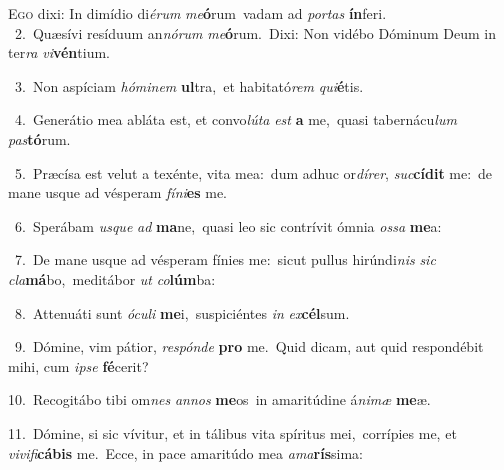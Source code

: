 \lettrine{\initial\textcolor{\initialcolor}{E}}{go} dixi: In dimídio di\-\textit{é}\-\textit{rum} \textit{me}\-\textbf{ó}rum~\star vadam ad \textit{por}\-\textit{tas} \textbf{ín}\-feri.\\
{\numbfont\textcolor{\numbcolor}{~2.}}~Quæsívi resíduum an\-\textit{nó}\-\textit{rum} \textit{me}\-\textbf{ó}rum.~\star Dixi: Non vidébo Dóminum Deum in ter\textit{ra} \textit{vi}\-\textbf{vén}tium.\par
{\numbfont\textcolor{\numbcolor}{~3.}}~Non aspíciam \textit{hó}\-\textit{mi}\textit{nem} \textbf{ul}\-tra,~\star et habitató\textit{rem} \textit{qui}\-\textbf{é}tis.\par
{\numbfont\textcolor{\numbcolor}{~4.}}~Generátio mea abláta est, et convo\-\textit{lú}\-\textit{ta} \textit{est} \textbf{a} me,~\star quasi tabernácu\textit{lum} \textit{pas}\-\textbf{tó}rum.\par
{\numbfont\textcolor{\numbcolor}{~5.}}~Præcísa est velut a texénte, vita mea:~\dagger dum adhuc or\-\textit{dí}\-\textit{rer}, \textit{suc}\-\textbf{cí}\textbf{dit} me:~\star de mane usque ad vésperam \textit{fí}\-\textit{ni}\textbf{es} me.\par
{\numbfont\textcolor{\numbcolor}{~6.}}~Sperábam \textit{us}\-\textit{que} \textit{ad} \textbf{ma}\-ne,~\star quasi leo sic contrívit ómnia \textit{os}\-\textit{sa} \textbf{me}\-a:\par
{\numbfont\textcolor{\numbcolor}{~7.}}~De mane usque ad vésperam fínies me:~\dagger sicut pullus hirúndi\textit{nis} \textit{sic} \textit{cla}\-\textbf{má}bo,~\star meditábor \textit{ut} \textit{co}\-\textbf{lúm}ba:\par
{\numbfont\textcolor{\numbcolor}{~8.}}~Attenuáti sunt \textit{ó}\-\textit{cu}\textit{li} \textbf{me}\-i,~\star suspiciéntes \textit{in} \textit{ex}\-\textbf{cél}sum.\par
{\numbfont\textcolor{\numbcolor}{~9.}}~Dómine, vim pátior, \textit{re}\-\textit{spón}\textit{de} \textbf{pro} me.~\star Quid dicam, aut quid respondébit mihi, cum \textit{ip}\-\textit{se} \textbf{fé}\-cerit?\par
{\numbfont\textcolor{\numbcolor}{10.}}~Recogitábo tibi om\textit{nes} \textit{an}\-\textit{nos} \textbf{me}\-os~\star in amaritúdine á\-\textit{ni}\-\textit{mæ} \textbf{me}\-æ.\par
{\numbfont\textcolor{\numbcolor}{11.}}~Dómine, si sic vívitur, et in tálibus vita spíritus mei,~\dagger corrípies me, et \textit{vi}\-\textit{vi}\textit{fi}\textbf{cá}\textbf{bis} me.~\star Ecce, in pace amaritúdo mea \textit{a}\-\textit{ma}\textbf{rís}sima:\par
